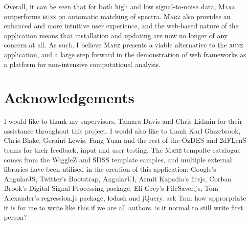 \documentclass[iop]{emulateapj}
\newcommand{\green}{\color{LimeGreen}}
\newcommand{\runz}{\textsc{runz}}
\newcommand{\marz}{\textsc{Marz}}
\begin{document}
Overall, it can be seen that for both high and low signal-to-noise data, \marz{} outperforms \runz{} on automatic matching of spectra. \marz{} also provides an enhanced and more intuitive user experience, and the web-based nature of the application means that installation and updating are now no longer of any concern at all. As such, I believe \marz{} presents a viable alternative to the \runz{} application, and a large step forward in the demonstration of web frameworks as a platform for non-intensive computational analysis.

\section*{Acknowledgements}
I would like to thank my supervisors, Tamara Davis and Chris Lidmin for their assistance throughout this project. I would also like to thank Karl Glazebrook, Chris Blake, Geraint Lewis, Fang Yuan and the rest of the OzDES and 2dFLenS teams for their feedback, input and user testing. The \marz{} tempalte catalogue comes from the WiggleZ and SDSS template samples, and multiple external libraries have been utilised in the creation of this application: Google's AngularJS, Twitter's Bootstrap, AngularUI, Armit Kapadia's fitsjs, Corban Brook's Digital Signal Processing package, Eli Grey's FileSaver.js, Tom Alexander's regression.js package, lodash and jQuery. {\green ask Tam how approrpriate it is for me to write like this if we are all authors. is it normal to still write first person?}


\end{document}
